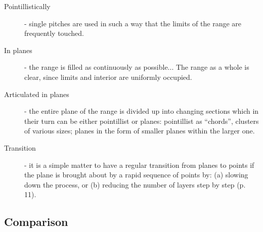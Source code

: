 \documentclass[a4paper,11pt]{article}
\newenvironment{MyShadequote}[1][]{%
    \ignorespaces%
    \begin{mdframed}[style=MyShadeQuoteStyle,#1]%
}{%
    \end{mdframed}%
    \ignorespacesafterend%
}%
\begin{document}
\begin{MyShadequote}
  \begin{description}
    \item[Pointillistically] - single pitches are used in such a way that the limits of the range are frequently touched.

    \item[In planes] - the range is filled as continuously as possible...
    The range as a whole is clear, since limits and interior are uniformly occupied.

    \item[Articulated in planes] - the entire plane of the range is divided up into changing sections which in their turn can be either pointillist or planes:
    pointillist as ``chords'', clusters of various sizes;
    planes in the form of smaller planes within the larger one.

    \item[Transition] - it is a simple matter to have a regular transition from planes to points if the plane is brought about by a rapid sequence of points by:
    (a) slowing down the process,
    or (b) reducing the number of layers step by step (p. 11).
  \end{description}

\end{MyShadequote}

\subsection{Comparison}
\label{sub:comparison}
\end{document}
